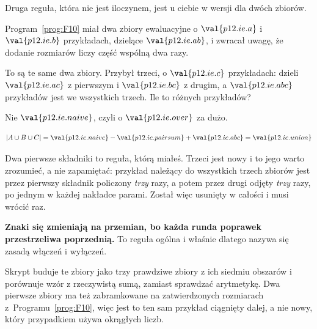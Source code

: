 \begin{fr}
Druga reguła, która nie jest iloczynem, jest u ciebie w wersji dla dwóch
zbiorów.

Program~\ref{prog:F10} miał dwa zbiory ewaluacyjne o $\val{p12.ie.a}$ i
$\val{p12.ie.b}$ przykładach, dzielące $\val{p12.ie.ab}$, i zwracał uwagę, że
dodanie rozmiarów liczy część wspólną dwa razy.

To są te same dwa zbiory. Przybył trzeci, o $\val{p12.ie.c}$ przykładach:
dzieli $\val{p12.ie.ac}$ z pierwszym i $\val{p12.ie.bc}$ z drugim, a
$\val{p12.ie.abc}$ przykładów jest we wszystkich trzech. Ile to różnych
przykładów?
\dotline
\nextframe
\end{fr}

\begin{fr}
Nie $\val{p12.ie.naive}$, czyli o $\val{p12.ie.over}$ za dużo.

\[ \lvert A \cup B \cup C \rvert = \val{p12.ie.naive}
   - \val{p12.ie.pairsum} + \val{p12.ie.abc} = \val{p12.ie.union} \]

Dwa pierwsze składniki to reguła, którą miałeś. Trzeci jest nowy i to jego
warto zrozumieć, a nie zapamiętać: przykład należący do wszystkich trzech
zbiorów jest przez pierwszy składnik policzony \emph{trzy} razy, a potem przez
drugi odjęty \emph{trzy} razy, po jednym w każdej nakładce parami. Został więc
usunięty w całości i musi wrócić raz.

\textbf{Znaki się zmieniają na przemian, bo każda runda poprawek przestrzeliwa
poprzednią.} To reguła ogólna i właśnie dlatego nazywa się zasadą włączeń i
wyłączeń.

\begin{note}
Skrypt buduje te zbiory jako trzy prawdziwe zbiory z ich siedmiu obszarów i
porównuje wzór z rzeczywistą sumą, zamiast sprawdzać arytmetykę. Dwa pierwsze
zbiory ma też zabramkowane na zatwierdzonych rozmiarach
z~Programu~\ref{prog:F10}, więc jest to ten sam przykład ciągnięty dalej, a
nie nowy, który przypadkiem używa okrągłych liczb.
\end{note}
\end{fr}

